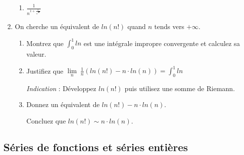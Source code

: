 \documentclass[]{article}
\begin{document}
\begin{enumerate}
\begin{enumerate}
	\item $\frac{1}{n^{1+\frac{1}{\sqrt{n}}}}$
\end{enumerate}

\item On cherche un équivalent de $ln(n!)$ quand $n$ tends vers $+\infty$.
\begin{enumerate}
	\item Montrez que $\displaystyle \int_0^1 ln$ est une intégrale impropre convergente et calculez sa valeur.
	
	\item Justifiez que $\displaystyle \lim\limits_{n} ~ \frac{1}{n}(ln(n!) - n \cdot ln(n)) = \int_{0}^{1} ln$
	
	\textit{Indication} : Développez $ln(n!)$ puis utilisez une somme de Riemann.
	
	\item Donnez un équivalent de $ln(n!)-n \cdot ln(n)$.
	
	Concluez que $ln(n!) \sim n \cdot ln(n)$.
\end{enumerate}

\end{enumerate}

\subsection{Séries de fonctions et séries entières}
\end{document}
